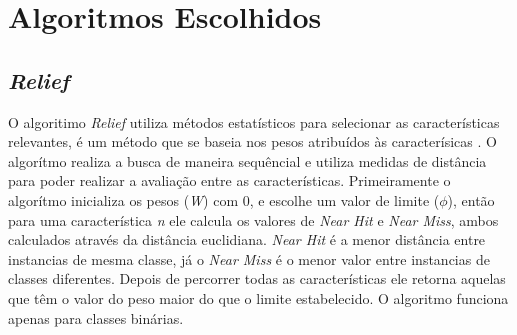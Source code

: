 \section{Algoritmos Escolhidos}

\subsection{\textit{Relief}}

O algoritimo \textit{Relief} utiliza métodos estatísticos para selecionar as características relevantes, é um método que se baseia nos pesos atribuídos às caracterísicas \cite{dash_1997}. O algorítmo realiza a busca de maneira sequêncial e utiliza medidas de distância para poder realizar a avaliação entre as características. Primeiramente o algorítmo inicializa os pesos (\textit{W}) com 0, e escolhe um valor de limite ($\phi$), então para uma característica \textit{n} ele calcula os valores de \textit{Near Hit} e \textit{Near Miss}, ambos calculados através da distância euclidiana. \textit{Near Hit} é a menor distância entre instancias de mesma classe, já o \textit{Near Miss} é o menor valor entre instancias de classes diferentes. Depois de percorrer todas as características ele retorna aquelas que têm o valor do peso maior do que o limite estabelecido. O algoritmo funciona apenas para classes binárias. \cite{dash_1997}